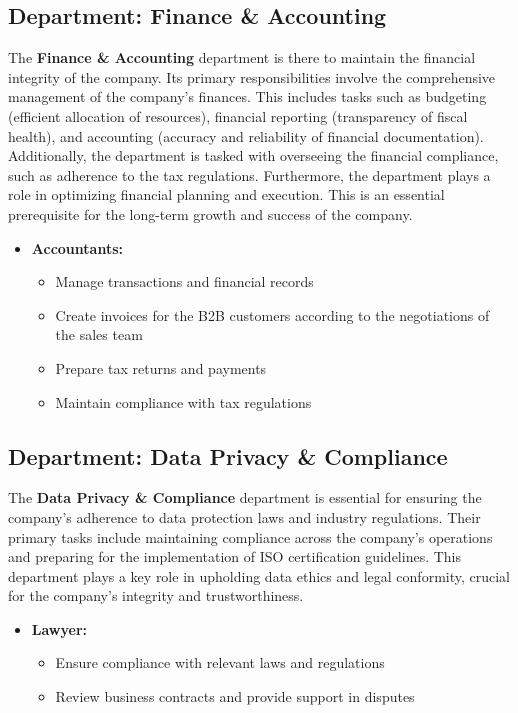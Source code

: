 \subsection{Department: Finance \& Accounting}
The \textbf{Finance \& Accounting} department is there to maintain the financial integrity of the company.
Its primary responsibilities involve the comprehensive management of the company's finances.
This includes tasks such as budgeting (efficient allocation of resources), financial reporting (transparency of fiscal health), and accounting (accuracy and reliability of financial documentation).
Additionally, the department is tasked with overseeing the financial compliance, such as adherence to the tax regulations.
Furthermore, the department plays a role in optimizing financial planning and execution.
This is an essential prerequisite for the long-term growth and success of the company.

\begin{itemize}
    \item \textbf{Accountants:}
    \begin{itemize}
        \item Manage transactions and financial records
        \item Create invoices for the B2B customers according to the negotiations of the sales team
        \item Prepare tax returns and payments
        \item Maintain compliance with tax regulations
    \end{itemize}
\end{itemize}

\subsection{Department: Data Privacy \& Compliance}
The \textbf{Data Privacy \& Compliance} department is essential for ensuring the company's adherence to data protection laws and industry regulations.
Their primary tasks include maintaining compliance across the company's operations and preparing for the implementation of ISO certification guidelines.
This department plays a key role in upholding data ethics and legal conformity, crucial for the company's integrity and trustworthiness.

\begin{itemize}
    \item \textbf{Lawyer:}
            \begin{itemize}
                \item Ensure compliance with relevant laws and regulations
                \item Review business contracts and provide support in disputes
            \end{itemize}
\end{itemize}

